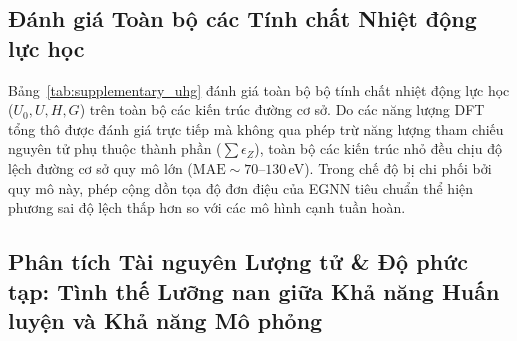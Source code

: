 \documentclass[10pt,twocolumn,letterpaper]{article}
\begin{document}
\subsection{Đánh giá Toàn bộ các Tính chất Nhiệt động lực học}

Bảng~\ref{tab:supplementary_uhg} đánh giá toàn bộ bộ tính chất nhiệt động lực học ($U_0, U, H, G$) trên toàn bộ các kiến trúc đường cơ sở. Do các năng lượng DFT tổng thô được đánh giá trực tiếp mà không qua phép trừ năng lượng tham chiếu nguyên tử phụ thuộc thành phần ($\sum \epsilon_Z$), toàn bộ các kiến trúc nhỏ đều chịu độ lệch đường cơ sở quy mô lớn ($\text{MAE} \sim 70\text{--}130$\,eV). Trong chế độ bị chi phối bởi quy mô này, phép cộng dồn tọa độ đơn điệu của EGNN tiêu chuẩn thể hiện phương sai độ lệch thấp hơn so với các mô hình cạnh tuần hoàn.



\subsection{Phân tích Tài nguyên Lượng tử \& Độ phức tạp: Tình thế Lưỡng nan giữa Khả năng Huấn luyện và Khả năng Mô phỏng}

\begin{table}[t]
\centering
\small
\caption{\textbf{So sánh Tài nguyên \& Độ phức tạp} giữa các mô hình tương biến, đối chiếu các yêu cầu lượng tử với các đối tác cổ điển. PRISM loại bỏ bộ nhớ vector trạng thái lượng tử, độ sâu cổng, và nhiễu lần đo lấy mẫu trong khi đạt kết quả tương đương hoặc vượt trội độ chính xác của Q-PRISM.}
\label{tab:resources}
\end{table}
\end{document}
